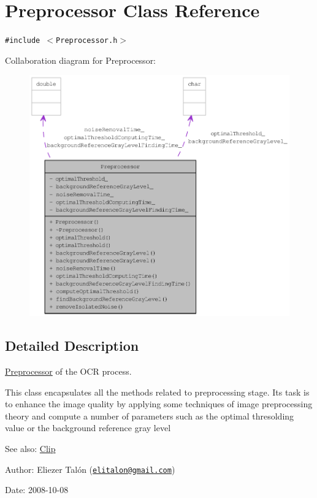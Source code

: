 \hypertarget{class_preprocessor}{
\section{Preprocessor Class Reference}
\label{class_preprocessor}
}
{\tt \#include $<$Preprocessor.h$>$}

Collaboration diagram for Preprocessor:\nopagebreak
\begin{figure}[H]
\begin{center}
\leavevmode
\includegraphics[width=400pt]{class_preprocessor__coll__graph}
\end{center}
\end{figure}


\subsection{Detailed Description}
\hyperlink{class_preprocessor}{Preprocessor} of the OCR process. 

This class encapsulates all the methods related to preprocessing stage. Its task is to enhance the image quality by applying some techniques of image preprocessing theory and compute a number of parameters such as the optimal thresolding value or the background reference gray level

\begin{Desc}
\item[See also:]\hyperlink{class_clip}{Clip}\end{Desc}
\begin{Desc}
\item[Author:]Eliezer Talón (\href{mailto:elitalon@gmail.com}{\tt elitalon@gmail.com}) \end{Desc}
\begin{Desc}
\item[Date:]2008-10-08 \end{Desc}


